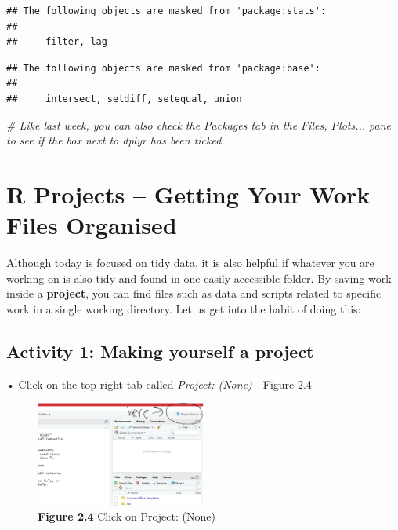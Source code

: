\documentclass[
]{book}
\newenvironment{Shaded}{\begin{snugshade}}{\end{snugshade}}
\newcommand{\CommentTok}[1]{\textcolor[rgb]{0.56,0.35,0.01}{\textit{#1}}}
\begin{document}
\begin{verbatim}
## The following objects are masked from 'package:stats':
## 
##     filter, lag
\end{verbatim}

\begin{verbatim}
## The following objects are masked from 'package:base':
## 
##     intersect, setdiff, setequal, union
\end{verbatim}

\begin{Shaded}
\begin{Highlighting}[]
\CommentTok{\# Like last week, you can also check the \textquotesingle{}Packages\textquotesingle{} tab in the \textquotesingle{}Files, Plots...\textquotesingle{} pane to see if the box next to \textquotesingle{}dplyr\textquotesingle{} has been ticked}
\end{Highlighting}
\end{Shaded}

\hypertarget{r-projects-getting-your-work-files-organised}{%
\section{R Projects -- Getting Your Work Files Organised}\label{r-projects-getting-your-work-files-organised}}

Although today is focused on tidy data, it is also helpful if whatever you are working on is also tidy and found in one easily accessible folder. By saving work inside a \textbf{project}, you can find files such as data and scripts related to specific work in a single working directory. Let us get into the habit of doing this:

\hypertarget{activity-1-making-yourself-a-project}{%
\subsection{Activity 1: Making yourself a project}\label{activity-1-making-yourself-a-project}}

• Click on the top right tab called \emph{Project: (None)} - Figure 2.4

\begin{figure}
\centering
\includegraphics[width=0.5\textwidth,height=\textheight]{Images/project.png}
\caption{\textbf{Figure 2.4} Click on Project: (None)}
\end{figure}
\end{document}
